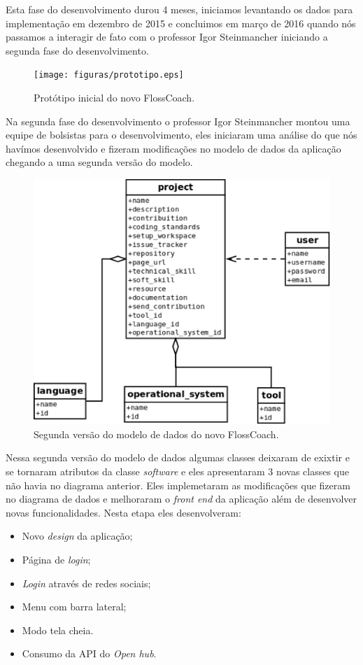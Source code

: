 Esta fase do desenvolvimento durou 4 meses, iniciamos levantando os dados para implementação
em dezembro de 2015 e concluimos em março de 2016 quando nós passamos a interagir de fato com o
professor Igor Steinmancher iniciando a segunda fase do desenvolvimento.  

\begin{figure}[h]
	\centering
	\label{fig:prototipo}
		\texttt{[image: figuras/prototipo.eps]}
	\caption{Protótipo inicial do novo FlossCoach.}
\end{figure}

Na segunda fase do desenvolvimento o professor Igor Steinmancher montou uma equipe 
de bolsistas para o desenvolvimento, eles iniciaram uma análise do que nós havímos desenvolvido
e fizeram modificações no modelo de dados da aplicação chegando a uma segunda versão do 
modelo.

\begin{figure}[h]
	\centering
	\label{fig:diagrama_fase2}
		\includegraphics[keepaspectratio=true,scale=0.3]{figuras/diagrama_fase2.eps}
	\caption{Segunda versão do modelo de dados do novo FlossCoach.}
\end{figure}

Nessa segunda versão do modelo de dados algumas classes deixaram de exixtir e se tornaram
atributos da classe \textit{software} e eles apresentaram 3 novas classes que não havia
no diagrama anterior. Eles implemetaram as modificações que fizeram no diagrama de dados
e melhoraram o \textit{front end} da aplicação além de desenvolver novas funcionalidades. 
Nesta etapa eles desenvolveram:
\begin{itemize}
\item Novo \textit{design} da aplicação;
\item Página de \textit{login}; 
\item \textit{Login} através de redes sociais;
\item Menu com barra lateral;
\item Modo tela cheia.
\item Consumo da API do \textit{Open hub}.
\end{itemize}

